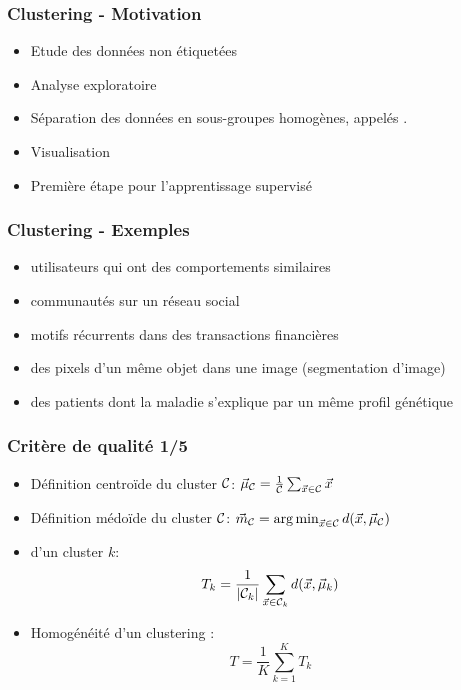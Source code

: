 


\begin{frame}
  \frametitle{Clustering - Motivation}
  \begin{itemize}
  	\item Etude des données non étiquetées
  	\item Analyse exploratoire
  	\item Séparation des données en sous-groupes homogènes, appelés .
  	\item Visualisation
  	\item Première étape pour l'apprentissage supervisé
  \end{itemize}
\end{frame}


\begin{frame}
  \frametitle{Clustering - Exemples}
  \begin{itemize}
  	\item utilisateurs qui ont des comportements similaires 
  	\item communautés sur un réseau social
  	\item motifs récurrents dans des transactions financières
  	\item des pixels d’un même objet dans une image (segmentation d’image)
  	\item des patients dont la maladie s’explique par un même profil génétique
  \end{itemize}
\end{frame}

\begin{frame}
\frametitle{Critère de qualité 1/5}
\begin{itemize}
	\item Définition centroïde du cluster $\mathcal{C}$: $\vec{\mu}_{\mathcal{C}} = \frac{1}{\mathcal{C}}\sum_{\vec{x} \in \mathcal{C}}\vec{x}$
	\item Définition médoïde du cluster $\mathcal{C}$: $\vec{m}_{\mathcal{C}} = \operatorname*{arg\,min}_{\vec{x} \in \mathcal{C}}d(\vec{x}, \vec{\mu}_{\mathcal{C}})$
	\item {} d'un cluster $k$: 
	\begin{equation*}
	T_k = \frac{1}{|\mathcal{C}_k|} \sum_{\vec{x} \in \mathcal{C}_k} d(\vec{x}, \vec{\mu}_k)
	\end{equation*}
	\item Homogénéité d'un clustering : 
	\begin{equation*}
	T = \frac1K\sum_{k=1}^{K}T_k
	\end{equation*}
\end{itemize}
\end{frame}

